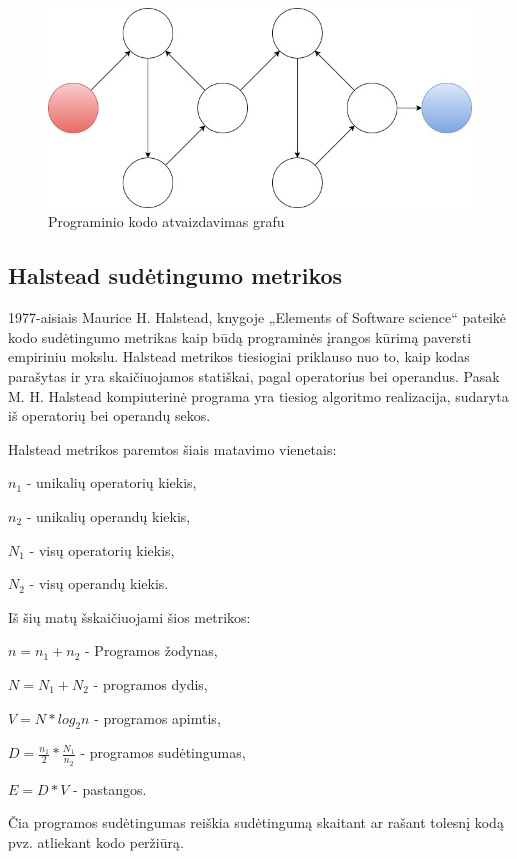 \documentclass{VUMIFPSbakalaurinis}
\begin{document}
\begin{figure}[H]
    \centering
    \includegraphics[scale=0.5]{img/Cyclomatic_graph_1}
    \caption{Programinio kodo atvaizdavimas grafu}
    \label{img:Cyclomatic_graph_1}
\end{figure}



\subsection{Halstead sudėtingumo metrikos}
1977-aisiais Maurice H. Halstead, knygoje „Elements of Software science“ pateikė kodo sudėtingumo metrikas kaip būdą programinės įrangos kūrimą paversti empiriniu mokslu. Halstead metrikos tiesiogiai priklauso nuo to, kaip kodas parašytas ir yra skaičiuojamos statiškai, pagal operatorius bei operandus. Pasak M. H. Halstead kompiuterinė programa yra tiesiog algoritmo realizacija, sudaryta iš operatorių bei operandų sekos.\cite{Halstead:1977:ESS:540137}

Halstead metrikos paremtos šiais matavimo vienetais:
\begin{description}  
\item\(n_1\) - unikalių operatorių kiekis,
\item\(n_2\) - unikalių operandų kiekis,
\item\(N_1\) - visų operatorių kiekis,
\item\(N_2\) - visų operandų kiekis.
\end{description} 
Iš šių matų šskaičiuojami šios metrikos:
\begin{description}  
\item\(n =  n_1 + n_2\) - Programos žodynas,
\item\(N = N_1 + N_2\) - programos dydis,
\item\(V = N * log_2n\) - programos apimtis,
\item\(D = \frac{n_1}{2} * \frac{N_1}{n_2}\) - programos sudėtingumas,
\item\(E = D * V\) - pastangos.
\end{description} 
Čia programos sudėtingumas reiškia sudėtingumą skaitant ar rašant tolesnį kodą pvz. atliekant kodo peržiūrą.
\end{document}
